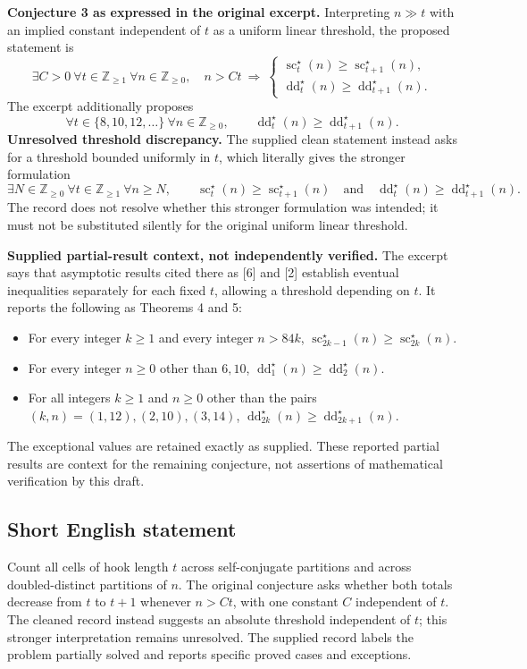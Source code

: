 \documentclass[11pt]{article}
\newcommand{\Z}{\mathbb{Z}}
\begin{document}
\textbf{Conjecture 3 as expressed in the original excerpt.} Interpreting \(n\gg t\) with an implied constant independent of \(t\) as a uniform linear threshold, the proposed statement is
\[
\exists C>0\ \forall t\in\Z_{\geq1}\ \forall n\in\Z_{\geq0},\quad
n>Ct\ \Longrightarrow\
\begin{cases}
\operatorname{sc}^{\star}_t(n)\geq\operatorname{sc}^{\star}_{t+1}(n),\\
\operatorname{dd}^{\star}_t(n)\geq\operatorname{dd}^{\star}_{t+1}(n).
\end{cases}
\]
The excerpt additionally proposes
\[
\forall t\in\{8,10,12,\ldots\}\ \forall n\in\Z_{\geq0},\qquad
\operatorname{dd}^{\star}_t(n)\geq\operatorname{dd}^{\star}_{t+1}(n).
\]
\textbf{Unresolved threshold discrepancy.} The supplied clean statement instead asks for a threshold bounded uniformly in \(t\), which literally gives the stronger formulation
\[
\exists N\in\Z_{\geq0}\ \forall t\in\Z_{\geq1}\ \forall n\geq N,\qquad
\operatorname{sc}^{\star}_t(n)\geq\operatorname{sc}^{\star}_{t+1}(n)
\quad\text{and}\quad
\operatorname{dd}^{\star}_t(n)\geq\operatorname{dd}^{\star}_{t+1}(n).
\]
The record does not resolve whether this stronger formulation was intended; it must not be substituted silently for the original uniform linear threshold.

\textbf{Supplied partial-result context, not independently verified.} The excerpt says that asymptotic results cited there as [6] and [2] establish eventual inequalities separately for each fixed \(t\), allowing a threshold depending on \(t\). It reports the following as Theorems 4 and 5:
\begin{itemize}
\item For every integer \(k\geq1\) and every integer \(n>84k\),
\(\operatorname{sc}^{\star}_{2k-1}(n)\geq\operatorname{sc}^{\star}_{2k}(n)\).
\item For every integer \(n\geq0\) other than \(6,10\),
\(\operatorname{dd}^{\star}_1(n)\geq\operatorname{dd}^{\star}_2(n)\).
\item For all integers \(k\geq1\) and \(n\geq0\) other than the pairs
\((k,n)=(1,12),(2,10),(3,14)\),
\(\operatorname{dd}^{\star}_{2k}(n)\geq\operatorname{dd}^{\star}_{2k+1}(n)\).
\end{itemize}
The exceptional values are retained exactly as supplied. These reported partial results are context for the remaining conjecture, not assertions of mathematical verification by this draft.
\subsection{Short English statement}
Count all cells of hook length \(t\) across self-conjugate partitions and across doubled-distinct partitions of \(n\). The original conjecture asks whether both totals decrease from \(t\) to \(t+1\) whenever \(n>Ct\), with one constant \(C\) independent of \(t\). The cleaned record instead suggests an absolute threshold independent of \(t\); this stronger interpretation remains unresolved. The supplied record labels the problem partially solved and reports specific proved cases and exceptions.
\end{document}
